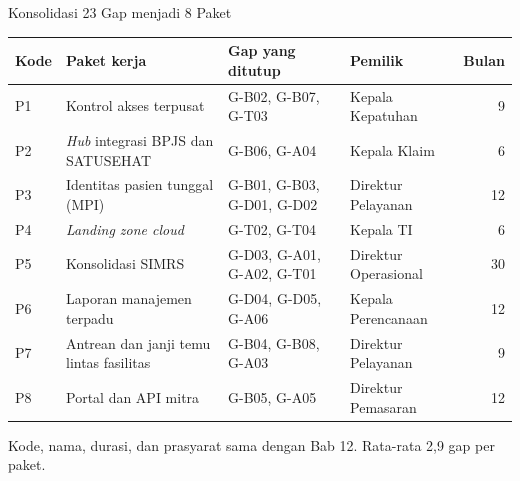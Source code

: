 \documentclass[aspectratio=169, table, 12pt]{beamer}
\begin{document}
\begin{frame}{{\Large Konsolidasi 23 Gap menjadi 8 Paket}}
  \scriptsize
  \begin{tabularx}{\textwidth}{l>{\raggedright\arraybackslash}X>{\raggedright\arraybackslash}p{3.9cm}>{\raggedright\arraybackslash}p{3.4cm}r}
    \hline
    \textbf{Kode} & \textbf{Paket kerja} & \textbf{Gap yang ditutup} & \textbf{Pemilik} & \textbf{Bulan} \\ \hline
    P1 & Kontrol akses terpusat & G-B02, G-B07, G-T03 & Kepala Kepatuhan & 9 \\ \hline
    P2 & \textit{Hub} integrasi BPJS dan SATUSEHAT & G-B06, G-A04 & Kepala Klaim & 6 \\ \hline
    P3 & Identitas pasien tunggal (MPI) & G-B01, G-B03, G-D01, G-D02 & Direktur Pelayanan & 12 \\ \hline
    P4 & \textit{Landing zone cloud} & G-T02, G-T04 & Kepala TI & 6 \\ \hline
    P5 & Konsolidasi SIMRS & G-D03, G-A01, G-A02, G-T01 & Direktur Operasional & 30 \\ \hline
    P6 & Laporan manajemen terpadu & G-D04, G-D05, G-A06 & Kepala Perencanaan & 12 \\ \hline
    P7 & Antrean dan janji temu lintas fasilitas & G-B04, G-B08, G-A03 & Direktur Pelayanan & 9 \\ \hline
    P8 & Portal dan API mitra & G-B05, G-A05 & Direktur Pemasaran & 12 \\ \hline
  \end{tabularx}

  \vspace{6pt}
  \small Kode, nama, durasi, dan prasyarat sama dengan Bab 12. Rata-rata 2,9 gap per paket.
\end{frame}
\end{document}
